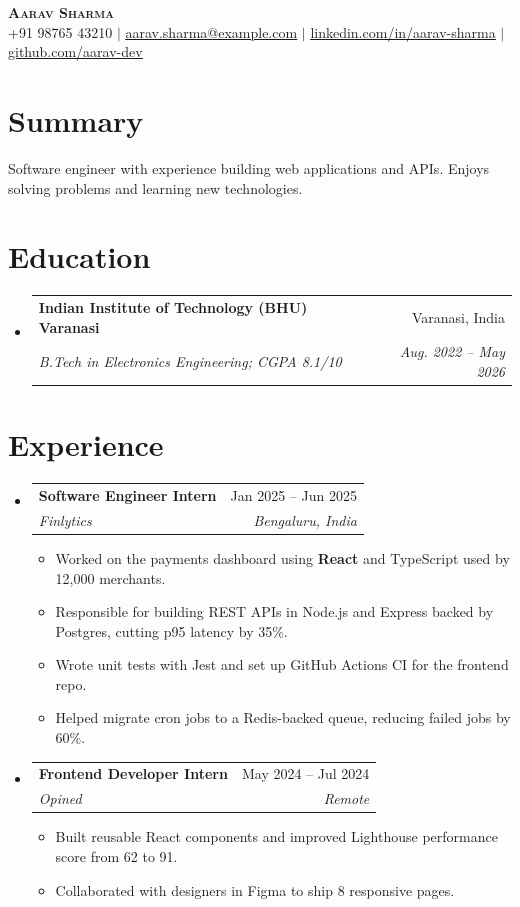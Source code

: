 \documentclass[letterpaper,11pt]{article}
\makeatletter
\newcommand{\resumeItem}[1]{
  \item\small{
    {#1 \vspace{-2pt}}
  }
}
\newcommand{\resumeSubheading}[4]{
  \vspace{-2pt}\item
    \begin{tabular*}{0.97\textwidth}[t]{l@{\extracolsep{\fill}}r}
      \textbf{#1} & #2 \\
      \textit{\small#3} & \textit{\small #4} \\
    \end{tabular*}\vspace{-7pt}
}
\newcommand{\resumeSubHeadingListStart}{\begin{itemize}[leftmargin=0.15in, label={}]}
\newcommand{\resumeSubHeadingListEnd}{\end{itemize}}
\newcommand{\resumeItemListStart}{\begin{itemize}}
\newcommand{\resumeItemListEnd}{\end{itemize}\vspace{-5pt}}
\makeatother
\begin{document}
\begin{center}
    \textbf{\Huge \scshape Aarav Sharma} \\ \vspace{1pt}
    \small +91 98765 43210 $|$ \href{mailto:aarav.sharma@example.com}{\underline{aarav.sharma@example.com}} $|$
    \href{https://linkedin.com/in/aarav-sharma}{\underline{linkedin.com/in/aarav-sharma}} $|$
    \href{https://github.com/aarav-dev}{\underline{github.com/aarav-dev}}
\end{center}

\section{Summary}
Software engineer with experience building web applications and APIs. Enjoys solving problems and learning new technologies.

\section{Education}
  \resumeSubHeadingListStart
    \resumeSubheading
      {Indian Institute of Technology (BHU) Varanasi}{Varanasi, India}
      {B.Tech in Electronics Engineering; CGPA 8.1/10}{Aug. 2022 -- May 2026}
  \resumeSubHeadingListEnd

\section{Experience}
  \resumeSubHeadingListStart
    \resumeSubheading
      {Software Engineer Intern}{Jan 2025 -- Jun 2025}
      {Finlytics}{Bengaluru, India}
      \resumeItemListStart
        \resumeItem{Worked on the payments dashboard using \textbf{React} and TypeScript used by 12,000 merchants.}
        \resumeItem{Responsible for building REST APIs in Node.js and Express backed by Postgres, cutting p95 latency by 35\%.}
        \resumeItem{Wrote unit tests with Jest and set up GitHub Actions CI for the frontend repo.}
        \resumeItem{Helped migrate cron jobs to a Redis-backed queue, reducing failed jobs by 60\%.}
      \resumeItemListEnd

    \resumeSubheading
      {Frontend Developer Intern}{May 2024 -- Jul 2024}
      {Opined}{Remote}
      \resumeItemListStart
        \resumeItem{Built reusable React components and improved Lighthouse performance score from 62 to 91.}
        \resumeItem{Collaborated with designers in Figma to ship 8 responsive pages.}
      \resumeItemListEnd
  \resumeSubHeadingListEnd
\end{document}
